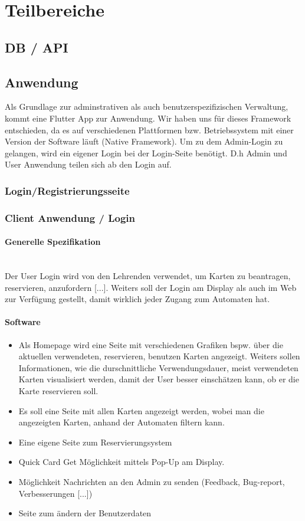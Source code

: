 \documentclass[a4paper]{article}
\begin{document}
\newpage
\section{Teilbereiche}
\subsection{DB / API}


\newpage
\subsection{Anwendung}
Als Grundlage zur adminstrativen als auch benutzerspezifizischen Verwaltung, kommt eine Flutter App zur Anwendung. Wir haben uns für dieses Framework entschieden, da es auf verschiedenen Plattformen bzw. Betriebssystem mit einer Version der Software läuft (Native Framework). Um zu dem Admin-Login zu gelangen, wird ein eigener Login bei der Login-Seite benötigt. D.h Admin und User Anwendung teilen sich ab den Login auf.

\subsubsection{Login/Registrierungsseite}

  
\subsubsection{Client Anwendung / Login}
\paragraph{Generelle Spezifikation}\mbox{}\\
Der User Login wird von den Lehrenden verwendet, um Karten zu beantragen, reservieren, anzufordern [...]. Weiters soll der Login am Display als auch im Web zur Verfügung gestellt, damit wirklich jeder Zugang zum Automaten hat. 

\paragraph{Software}
\begin{itemize}
  \item Als Homepage wird eine Seite mit verschiedenen Grafiken bspw. über die aktuellen verwendeten, reservieren, benutzen Karten angezeigt. Weiters sollen Informationen, wie die durschnittliche Verwendungsdauer, meist verwendeten Karten visualisiert werden, damit der User besser einschätzen kann, ob er die Karte reservieren soll.
  \item Es soll eine Seite mit allen Karten angezeigt werden, wobei man die angezeigten Karten, anhand der Automaten filtern kann.
  \item Eine eigene Seite zum Reservierungsystem
  \item Quick Card Get Möglichkeit mittels Pop-Up am Display.
  \item Möglichkeit Nachrichten an den Admin zu senden (Feedback, Bug-report, Verbesserungen [...])
  \item Seite zum \"andern der Benutzerdaten
\end{itemize}
\end{document}
